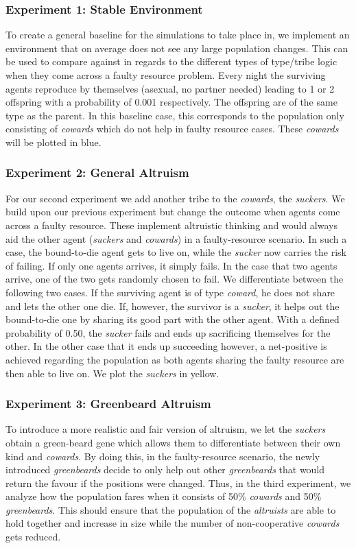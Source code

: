 \documentclass[sigconf]{acmart}
\newcommand{\VProbAltruistDies}{0.50\xspace}
\newcommand{\VProbKids}{0.001\xspace}
\newcommand{\cowards}{\textit{cowards}\xspace}
\newcommand{\coward}{\textit{coward}\xspace}
\newcommand{\altruists}{\textit{altruists}\xspace}
\newcommand{\suckers}{\textit{suckers}\xspace}
\newcommand{\sucker}{\textit{sucker}\xspace}
\newcommand{\greenbeards}{\textit{greenbeards}\xspace}
\begin{document}
    \subsubsection*{Experiment 1: Stable Environment}
    To create a general baseline for the simulations to take place in, we implement an environment that on average does not see any large population changes.
    This can be used to compare against in regards to the different types of type/tribe logic when they come across a faulty resource problem.
    Every night the surviving agents reproduce by themselves (asexual, no partner needed) leading to 1 or 2 offspring with a probability of \VProbKids respectively.
    The offspring are of the same type as the parent.
    In this baseline case, this corresponds to the population only consisting of \cowards which do not help in faulty resource cases.
    These \cowards will be plotted in blue.

    \subsubsection*{Experiment 2: General Altruism}
    For our second experiment we add another tribe to the \cowards, the \suckers.
    We build upon our previous experiment but change the outcome when agents come across a faulty resource.
    These implement altruistic thinking and would always aid the other agent (\suckers and \cowards) in a faulty-resource scenario.
    In such a case, the bound-to-die agent gets to live on, while the \sucker now carries the risk of failing.
    If only one agents arrives, it simply fails.
    In the case that two agents arrive, one of the two gets randomly chosen to fail.
    We differentiate between the following two cases.
    If the surviving agent is of type \coward, he does not share and lets the other one die.
    If, however, the survivor is a \sucker, it helps out the bound-to-die one by sharing its good part with the other agent.
    With a defined probability of \VProbAltruistDies, the \sucker fails and ends up sacrificing themselves for the other.
    In the other case that it ends up succeeding however, a net-positive is achieved regarding the population as both agents sharing the faulty resource are then able to live on.
    We plot the \suckers in yellow.


    \subsubsection*{Experiment 3: Greenbeard Altruism}
    To introduce a more realistic and fair version of altruism, we let the \suckers obtain a green-beard gene which allows them to differentiate between their own kind and \cowards.
    By doing this, in the faulty-resource scenario, the newly introduced \greenbeards decide to only help out other \greenbeards that would return the favour if the positions were changed.
    Thus, in the third experiment, we analyze how the population fares when it consists of 50\% \cowards and 50\% \greenbeards.
    This should ensure that the population of the \altruists are able to hold together and increase in size while the number of non-cooperative \cowards gets reduced.
\end{document}
